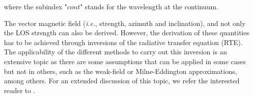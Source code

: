 where the subindex "$cont$" stands for the wavelength at the continuum. 

The vector magnetic field (\textit{i.e.}, strength, azimuth and inclination), and not only the LOS strength can also be derived. However, the derivation of these quantities has to be achieved through inversions of the radiative transfer equation (RTE). The applicability of the different methods to carry out this inversion is an extensive topic as there are some assumptions that can be applied in some cases but not in others, such as the weak-field or Milne-Eddington approximations, among others. For an extended discussion of this topic, we refer the interested reader to \cite{del2016inversion}.   